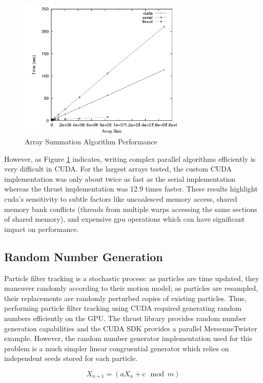 \documentclass{article}
\begin{document}
\begin{figure}
\centering
\includegraphics[width=0.7\textwidth]{data/summation_plot.png}
\caption{Array Summation Algorithm Performance}
\label{summation_plot}
\end{figure}

However, as Figure \ref{summation_plot} indicates, writing complex parallel algorithms efficiently is very difficult in CUDA. For the largest arrays tested, the custom CUDA implementation was only about twice as fast as the serial implementation whereas the thrust implementation was 12.9 times faster. These results highlight cuda's sensitivity to subtle factors like uncoalesced memory access, shared memory bank conflicts (threads from multiple warps accessing the same sections of shared memory), and expensive gpu operations which can have significant impact on performance.\cite{bestprac}

\subsection{Random Number Generation}
Particle filter tracking is a stochastic process: as particles are time updated, they maneuver randomly according to their motion model; as particles are resampled, their replacements are randomly perturbed copies of existing particles. Thus, performing particle filter tracking using CUDA required generating random numbers efficiently on the GPU. The thrust library provides random number generation capabilities and the CUDA SDK provides a parallel MersenneTwister example. However, the random number generator implementation used for this problem is a much simpler linear congruential generator which relies on independent seeds stored for each particle.

\begin{equation}\label{lcgeq1}
X_{n+1}=(aX_{n}+c \mod m)
\end{equation}
\end{document}
